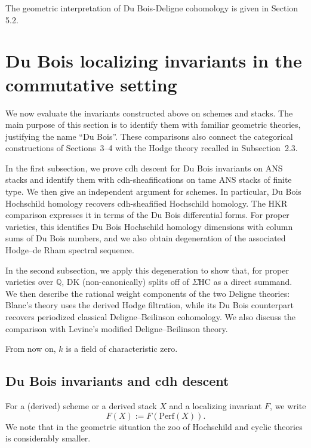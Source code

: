 \documentclass{amsart}
\theoremstyle{plain}
\theoremstyle{definition}
\newcommand{\bbQ}{\mathbb{Q}}
\newcommand{\Perf}{\mathrm{Perf}}
\newcommand{\HC}{\mathrm{HC}}
\newcommand{\DK}{\mathrm{DK}}
\begin{document}
The geometric interpretation of Du Bois-Deligne cohomology is given in Section 5.2.













\section{Du Bois localizing invariants in the commutative setting}\label{seccommutativeDB}

We now evaluate the invariants constructed above on schemes and stacks. The main purpose of this section is to identify them with familiar geometric theories, justifying the name ``Du Bois''. These comparisons also connect the categorical constructions of Sections~3--4 with the Hodge theory recalled in Subsection~2.3.

In the first subsection, we prove cdh descent for Du Bois invariants on ANS stacks and identify them with cdh-sheafifications on tame ANS stacks of finite type. We then give an independent argument for schemes.
In particular, Du Bois Hochschild homology recovers cdh-sheafified Hochschild homology.
The HKR comparison expresses it in terms of the Du Bois differential forms. For proper varieties, this identifies Du Bois Hochschild homology dimensions with column sums of Du Bois numbers, and we also obtain degeneration of the associated Hodge--de Rham spectral sequence.

In the second subsection, we apply this degeneration to show that, for proper varieties over $\bbQ$, $\DK$ (non-canonically) splits off of $\Sigma\HC$ as a direct summand. We then describe the rational weight components of the two Deligne theories: Blanc's theory uses the derived Hodge filtration, while its Du Bois counterpart recovers periodized classical Deligne--Beilinson cohomology.
We also discuss the comparison with Levine's modified Deligne--Beilinson theory.

\medskip

From now on, $k$ is a field of characteristic zero. 

\subsection{Du Bois invariants and cdh descent}

For a (derived) scheme or a derived stack $X$ and a localizing invariant $F$, we write
\[F(X):=F(\Perf(X)).\] We note that in the geometric situation the zoo of Hochschild and cyclic theories is considerably smaller.
\end{document}
